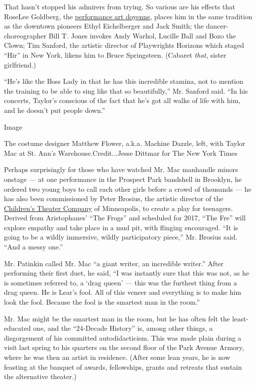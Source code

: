 That hasn't stopped his admirers from trying. So various are his effects
that RoseLee Goldberg, the
\href{http://www.nytimes3xbfgragh.onion/2005/11/04/arts/design/performance-art-gets-its-biennial.html}{performance
art doyenne}, places him in the same tradition as the downtown pioneers
Ethyl Eichelberger and Jack Smith; the dancer-choreographer Bill T.
Jones invokes Andy Warhol, Lucille Ball and Bozo the Clown; Tim Sanford,
the artistic director of Playwrights Horizons which staged ``Hir'' in
New York, likens him to Bruce Springsteen. (Cabaret \emph{that}, sister
girlfriend.)

``He's like the Boss Lady in that he has this incredible stamina, not to
mention the training to be able to sing like that so beautifully,'' Mr.
Sanford said. ``In his concerts, Taylor's conscious of the fact that
he's got all walks of life with him, and he doesn't put people down.''

Image

The costume designer Matthew Flower, a.k.a. Machine Dazzle, left, with
Taylor Mac at St. Ann's Warehouse.Credit...Jesse Dittmar for The New
York Times

Perhaps surprisingly for those who have watched Mr. Mac manhandle minors
onstage --- at one performance in the Prospect Park bandshell in
Brooklyn, he ordered two young boys to call each other girls before a
crowd of thousands --- he has also been commissioned by Peter Brosius,
the artistic director of the
\href{https://www.childrenstheatre.org/}{Children's Theater Company} of
Minneapolis, to create a play for teenagers. Derived from Aristophanes'
``The Frogs'' and scheduled for 2017, ``The Fre'' will explore empathy
and take place in a mud pit, with flinging encouraged. ``It is going to
be a wildly immersive, wildly participatory piece,'' Mr. Brosius said.
``And a messy one.''

Mr. Patinkin called Mr. Mac ``a giant writer, an incredible writer.''
After performing their first duet, he said, ``I was instantly sure that
this was not, as he is sometimes referred to, a `drag queen' --- this
was the furthest thing from a drag queen. He is Lear's fool. All of this
veneer and everything is to make him look the fool. Because the fool is
the smartest man in the room.''

Mr. Mac might be the smartest man in the room, but he has often felt the
least-educated one, and the ``24-Decade History'' is, among other
things, a disgorgement of his committed autodidacticism. This was made
plain during a visit last spring to his quarters on the second floor of
the Park Avenue Armory, where he was then an artist in residence. (After
some lean years, he is now feasting at the banquet of awards,
fellowships, grants and retreats that sustain the alternative theater.)

